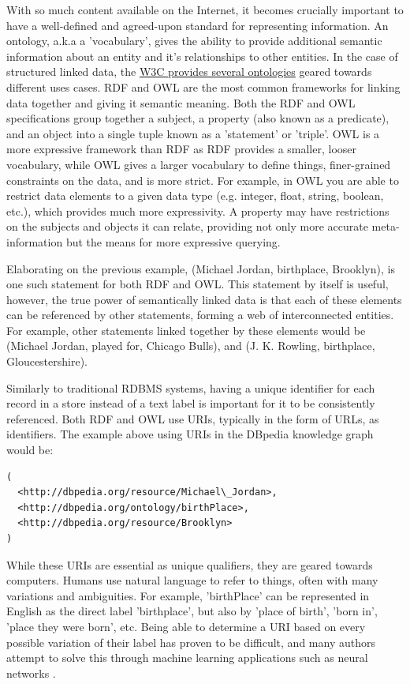 \documentclass[sigplan,screen]{acmart}
\begin{document}
With so much content available on the Internet, it becomes crucially important to have a well-defined and agreed-upon standard for representing information. An ontology, a.k.a a 'vocabulary', gives the ability to provide additional semantic information about an entity and it's relationships to other entities. In the case of structured linked data, the \href{https://www.w3.org/standards/semanticweb/ontology}{W3C provides several ontologies} geared towards different uses cases. RDF and OWL are the most common frameworks for linking data together and giving it semantic meaning. Both the RDF and OWL specifications group together a subject, a property (also known as a predicate), and an object into a single tuple known as a 'statement' or 'triple'. OWL is a more expressive framework than RDF as RDF provides a smaller, looser vocabulary, while OWL gives a larger vocabulary to define things, finer-grained constraints on the data, and is more strict. For example, in OWL you are able to restrict data elements to a given data type (e.g. integer, float, string, boolean, etc.), which provides much more expressivity. A property may have restrictions on the subjects and objects it can relate, providing not only more accurate meta-information but the means for more expressive querying.

Elaborating on the previous example, (Michael Jordan, birthplace, Brooklyn), is one such statement for both RDF and OWL. This statement by itself is useful, however, the true power of semantically linked data is that each of these elements can be referenced by other statements, forming a web of interconnected entities. For example, other statements linked together by these elements would be (Michael Jordan, played for, Chicago Bulls), and (J. K. Rowling, birthplace, Gloucestershire).

Similarly to traditional RDBMS systems, having a unique identifier for each record in a store instead of a text label is important for it to be consistently referenced. Both RDF and OWL use URIs, typically in the form of URLs, as identifiers. The example above using URIs in the DBpedia knowledge graph would be:

\begin{lstlisting}[breaklines=true]
(
  <http://dbpedia.org/resource/Michael\_Jordan>,
  <http://dbpedia.org/ontology/birthPlace>,
  <http://dbpedia.org/resource/Brooklyn>
)
\end{lstlisting}

While these URIs are essential as unique qualifiers, they are geared towards computers. Humans use natural language to refer to things, often with many variations and ambiguities. For example, 'birthPlace' can be represented in English as the direct label 'birthplace', but also by 'place of birth', 'born in', 'place they were born', etc. Being able to determine a URI based on every possible variation of their label has proven to be difficult, and many authors attempt to solve this through machine learning applications such as neural networks \cite{zheng-question-over-knowledge-graph,zheng-how-to-build-rdf-templates,complex-questions-over-knowledge-bases}.
\end{document}
